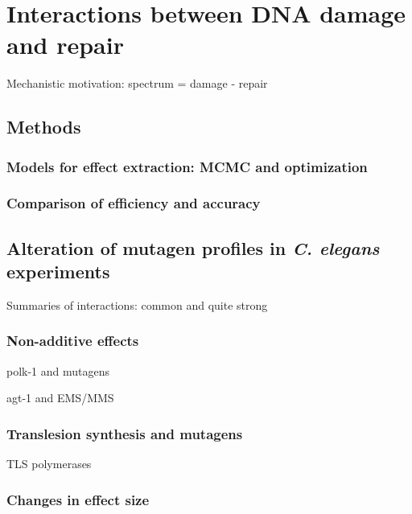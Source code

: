 
\pagestyle{empty}

\section{Interactions between DNA damage and repair}

Mechanistic motivation: spectrum = damage - repair





\subsection{Methods}

\subsubsection{Models for effect extraction: MCMC and optimization}

\subsubsection{Comparison of efficiency and accuracy}



\subsection{Alteration of mutagen profiles in \textit{C. elegans} experiments}

Summaries of interactions: common and quite strong

\subsubsection{Non-additive effects}

polk-1 and mutagens

agt-1 and EMS/MMS

\subsubsection{Translesion synthesis and mutagens}

TLS polymerases

\subsubsection{Changes in effect size}

